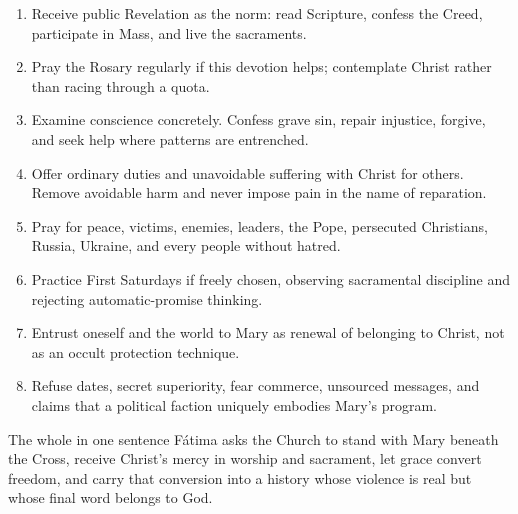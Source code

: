 \begin{enumerate}
  \item Receive public Revelation as the norm: read Scripture, confess the Creed, participate in Mass, and live the sacraments.
  \item Pray the Rosary regularly if this devotion helps; contemplate Christ rather than racing through a quota.
  \item Examine conscience concretely. Confess grave sin, repair injustice, forgive, and seek help where patterns are entrenched.
  \item Offer ordinary duties and unavoidable suffering with Christ for others. Remove avoidable harm and never impose pain in the name of reparation.
  \item Pray for peace, victims, enemies, leaders, the Pope, persecuted Christians, Russia, Ukraine, and every people without hatred.
  \item Practice First Saturdays if freely chosen, observing sacramental discipline and rejecting automatic-promise thinking.
  \item Entrust oneself and the world to Mary as renewal of belonging to Christ, not as an occult protection technique.
  \item Refuse dates, secret superiority, fear commerce, unsourced messages, and claims that a political faction uniquely embodies Mary's program.
\end{enumerate}

\begin{studybox}{The whole in one sentence}
Fátima asks the Church to stand with Mary beneath the Cross, receive Christ's mercy in worship and sacrament, let grace convert freedom, and carry that conversion into a history whose violence is real but whose final word belongs to God.
\end{studybox}
